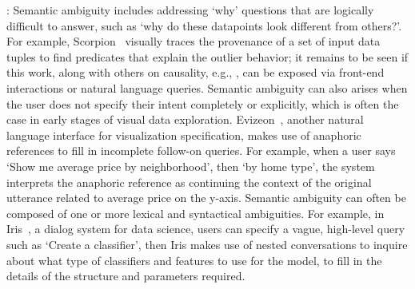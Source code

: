 : Semantic ambiguity 
includes addressing `why' questions 
that are logically difficult to answer, 
such as `why do these datapoints look different from others?'. 
For example, Scorpion~\cite{Wu2013} visually traces the provenance 
of a set of input data tuples to find predicates 
that explain the outlier behavior;
it remains to be seen if this work, along with others
on causality, e.g., \cite{meliou2010causality,roy2014formal},
can be exposed via front-end interactions or natural language
queries. 
Semantic ambiguity can also arises 
when the user does not specify their 
intent completely or explicitly, 
which is often the case in early stages 
of visual data exploration. 
Evizeon~\cite{Hoque2017}, 
another natural language interface for visualization
specification, 
makes use of anaphoric references 
to fill in incomplete follow-on queries. 
For example, when a user says 
`Show me average price by neighborhood', 
then `by home type', the system interprets 
the anaphoric reference as continuing the 
context of the original utterance related 
to average price on the y-axis. 
Semantic ambiguity can often be composed 
of one or more lexical and syntactical ambiguities. 
For example, in Iris~\cite{Fast2018}, a dialog system for
data science, users can specify a vague, 
high-level query such as `Create a classifier', 
then Iris makes use of nested conversations 
to inquire about what type of classifiers and features to use for the model, 
to fill in the details of the structure and parameters required. 


